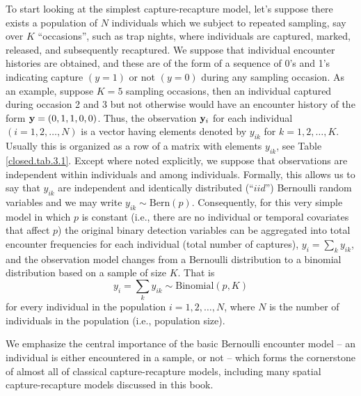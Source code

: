 To start looking at the simplest capture-recapture model, let's suppose
there exists a population of $N$ individuals which we
subject to repeated sampling, say over $K$ ``occasions'', such as trap nights, where individuals
are captured, marked, released, and subsequently recaptured.  We suppose that
individual encounter histories are obtained, and these are of the form
of a sequence of 0's and 1's indicating capture $(y=1)$ or not $(y=0)$
during any sampling occasion.
As an example, suppose
$K=5$ sampling occasions, then an individual captured during occasion
2 and 3 but not otherwise would have an encounter history of the form
${\bf y}=(0,1,1,0,0)$. Thus, the observation ${\bf y}_{i}$ for each
individual $(i=1,2,\hdots,N)$ is a vector having elements denoted by $y_{ik}$ for
$k=1,2,\hdots,K$. Usually this is organized as a row of a matrix with
elements $y_{ik}$, see Table \ref{closed.tab.3.1}. Except where noted
explicitly, we suppose that observations are independent within
individuals and among individuals.  Formally, this allows us to say
that $y_{ik}$ are independent and identically distributed (``$iid$'')
Bernoulli random variables and we may write $y_{ik}
\sim \mbox{Bern}(p)$.  Consequently, for this very simple model in
which $p$ is constant (i.e., there are no individual or temporal
covariates that affect $p$) the original binary detection variables
can be aggregated into total encounter frequencies for each individual
(total number of captures), $y_{i} = \sum_{k} y_{ik}$, and the
observation model changes from a Bernoulli distribution to a
binomial distribution based on a sample of size $K$. That is
\[
y_{i}  = \sum_{k} y_{ik} \sim \mbox{Binomial}(p,K)
\]
for every individual in the population $i=1,2,\ldots,N$, where $N$ is
the number of individuals in the population (i.e., population size).

We emphasize the central importance of the basic Bernoulli encounter model
-- an individual is either encountered in a sample, or not --
 which forms
the cornerstone of almost all of classical
capture-recapture models, including many spatial capture-recapture
models discussed in this book.

